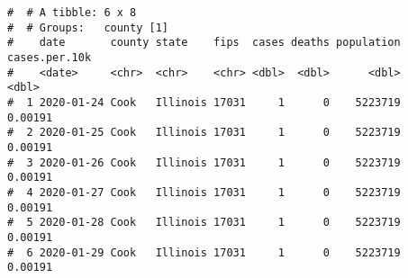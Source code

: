 \documentclass[letterpaper,12pt,twoside,]{pinp}
\begin{document}
\begin{Shaded}
\begin{Highlighting}[]
{{{{{{{{\StringTok{ }\OperatorTok{%>%}
\StringTok{  }\NormalTok{dplyr}\OperatorTok{::}\KeywordTok{group_by}\NormalTok{(state, date) }\OperatorTok{%>%}
\StringTok{  }\NormalTok{dplyr}\OperatorTok{::}\KeywordTok{filter}\NormalTok{(date }\OperatorTok{>=}\StringTok{ "2020-03-15"}\NormalTok{) }\OperatorTok{%>%}
\StringTok{  }\NormalTok{dplyr}\OperatorTok{::}\KeywordTok{summarise}\NormalTok{(}\DataTypeTok{cases =} \KeywordTok{sum}\NormalTok{(cases)) }\OperatorTok{%>%}
\StringTok{  }\NormalTok{dplyr}\OperatorTok{::}\KeywordTok{left_join}\NormalTok{(pop_state, }\DataTypeTok{by =} \StringTok{"state"}\NormalTok{) }\OperatorTok{%>%}
\StringTok{  }\NormalTok{dplyr}\OperatorTok{::}\KeywordTok{mutate}\NormalTok{(}\DataTypeTok{cases.per.10k =}\NormalTok{ cases }\OperatorTok{/}\StringTok{ }\NormalTok{population }\OperatorTok{*}\StringTok{ }\FloatTok{1e4}\NormalTok{, }\DataTypeTok{state =} \KeywordTok{factor}\NormalTok{(state),}
                \DataTypeTok{time =} \KeywordTok{as.numeric}\NormalTok{(date }\OperatorTok{-}\StringTok{ }\KeywordTok{min}\NormalTok{(date)) }\OperatorTok{+}\StringTok{ }\DecValTok{1}\NormalTok{)}
\end{Highlighting}
\end{Shaded}

\begin{Shaded}
\begin{Highlighting}[]
\end{Highlighting}
\end{Shaded}

\begin{ShadedResult}
\begin{verbatim}
#  # A tibble: 6 x 8
#  # Groups:   county [1]
#    date       county state    fips  cases deaths population cases.per.10k
#    <date>     <chr>  <chr>    <chr> <dbl>  <dbl>      <dbl>         <dbl>
#  1 2020-01-24 Cook   Illinois 17031     1      0    5223719       0.00191
#  2 2020-01-25 Cook   Illinois 17031     1      0    5223719       0.00191
#  3 2020-01-26 Cook   Illinois 17031     1      0    5223719       0.00191
#  4 2020-01-27 Cook   Illinois 17031     1      0    5223719       0.00191
#  5 2020-01-28 Cook   Illinois 17031     1      0    5223719       0.00191
#  6 2020-01-29 Cook   Illinois 17031     1      0    5223719       0.00191
\end{verbatim}
\end{ShadedResult}

\begin{Shaded}
\begin{Highlighting}[]
\end{Highlighting}
\end{Shaded}
\end{document}
